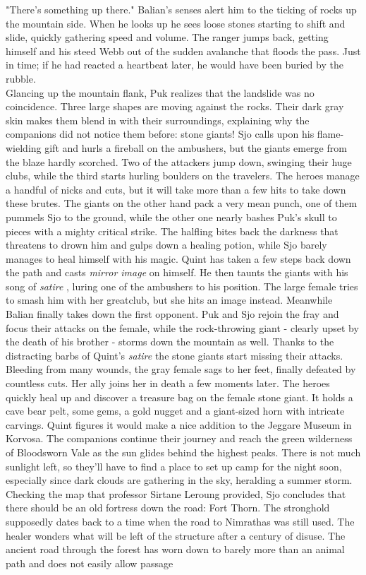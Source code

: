 "There's something up there." Balian's senses alert him to the ticking of rocks up the mountain side. When he looks up he sees loose stones starting to shift and slide, quickly gathering speed and volume. The ranger jumps back, getting himself and his steed Webb out of the sudden avalanche that floods the pass. Just in time; if he had reacted a heartbeat later, he would have been buried by the rubble.\\

Glancing up the mountain flank, Puk realizes that the landslide was no coincidence. Three large shapes are moving against the rocks. Their dark gray skin makes them blend in with their surroundings, explaining why the companions did not notice them before: stone giants! Sjo calls upon his flame-wielding gift and hurls a fireball on the ambushers, but the giants emerge from the blaze hardly scorched. Two of the attackers jump down, swinging their huge clubs, while the third starts hurling boulders on the travelers. The heroes manage a handful of nicks and cuts, but it will take more than a few hits to take down these brutes. The giants on the other hand pack a very mean punch, one of them pummels Sjo to the ground, while the other one nearly bashes Puk's skull to pieces with a mighty critical strike. The halfling bites back the darkness that threatens to drown him and gulps down a healing potion, while Sjo barely manages to heal himself with his magic. Quint has taken a few steps back down the path and casts {\itshape mirror image} on himself. He then taunts the giants with his song of  {\itshape satire} , luring one of the ambushers to his position. The large female tries to smash him with her greatclub, but she hits an image instead. Meanwhile Balian finally takes down the first opponent. Puk and Sjo rejoin the fray and focus their attacks on the female, while the rock-throwing giant - clearly upset by the death of his brother - storms down the mountain as well. Thanks to the distracting barbs of Quint's  {\itshape satire} the stone giants start missing their attacks. Bleeding from many wounds, the gray female sags to her feet, finally defeated by countless cuts. Her ally joins her in death a few moments later. The heroes quickly heal up and discover a treasure bag on the female stone giant. It holds a cave bear pelt, some gems, a gold nugget and a giant-sized horn with intricate carvings. Quint figures it would make a nice addition to the Jeggare Museum in Korvosa. The companions continue their journey and reach the green wilderness of Bloodsworn Vale as the sun glides behind the highest peaks. There is not much sunlight left, so they'll have to find a place to set up camp for the night soon, especially since dark clouds are gathering in the sky, heralding a summer storm. Checking the map that professor Sirtane Leroung provided, Sjo concludes that there should be an old fortress down the road: Fort Thorn. The stronghold supposedly dates back to a time when the road to Nimrathas was still used. The healer wonders what will be left of the structure after a century of disuse. The ancient road through the forest has worn down to barely more than an animal path and does not easily allow passage 